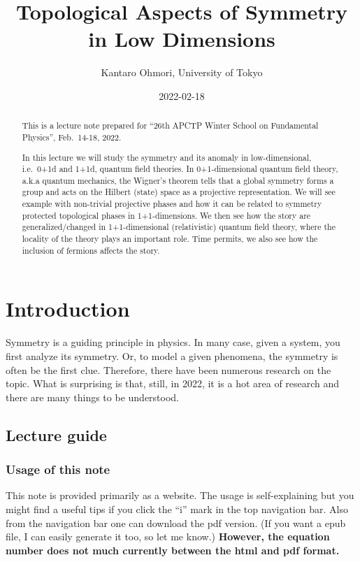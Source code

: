 \documentclass[
]{scrartcl}
\title{Topological Aspects of Symmetry in Low Dimensions}
\author{Kantaro Ohmori, University of Tokyo}
\date{2022-02-18}
\numberwithin{equation}{section}
\theoremstyle{definition}
\theoremstyle{definition}
\theoremstyle{definition}
\theoremstyle{definition}
\theoremstyle{remark}
\begin{document}
\maketitle
\begin{abstract}
This is a lecture note prepared for ``26th APCTP Winter School on Fundamental Physics'', Feb.~14-18, 2022.

In this lecture we will study the symmetry and its anomaly in low-dimensional, i.e.~0+1d and 1+1d, quantum field theories.
In 0+1-dimensional quantum field theory, a.k.a quantum mechanics, the Wigner's theorem tells that a global symmetry forms a group and acts on the Hilbert (state) space as a projective representation. We will see example with non-trivial projective phases and how it can be related to symmetry protected topological phases in 1+1-dimensions. We then see how the story are generalized/changed in 1+1-dimensional (relativistic) quantum field theory, where the locality of the theory plays an important role.
Time permits, we also see how the inclusion of fermions affects the story.
\end{abstract}

{
\setcounter{tocdepth}{2}
\tableofcontents
}
\hypertarget{introduction}{%
\section{Introduction}\label{introduction}}

Symmetry is a guiding principle in physics. In many case, given a system, you first analyze its symmetry. Or, to model a given phenomena, the symmetry is often be the first clue.
Therefore, there have been numerous research on the topic. What is surprising is that, still, in 2022, it is a hot area of research and there are many things to be understood.

\hypertarget{lecture-guide}{%
\subsection{Lecture guide}\label{lecture-guide}}

\hypertarget{usage-of-this-note}{%
\subsubsection{Usage of this note}\label{usage-of-this-note}}

This note is provided primarily as a website.
The usage is self-explaining but you might find a useful tips if you click the ``i'' mark in the top navigation bar. Also from the navigation bar one can download the pdf version. (If you want a epub file, I can easily generate it too, so let me know.) \textbf{However, the equation number does not much currently between the html and pdf format.}
\end{document}

